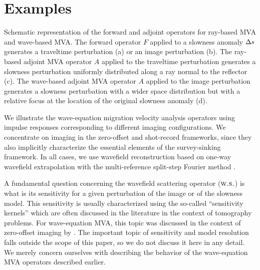 \section{Examples}

 {Schematic representation of the
forward and adjoint operators for ray-based MVA and wave-based
MVA. The forward operator $F$ applied to a slowness anomaly $\Delta s$
generates a traveltime perturbation (a) or an image perturbation
(b). The ray-based adjoint MVA operator $A$ applied to the traveltime
perturbation generates a slowness perturbation uniformly distributed
along a ray normal to the reflector (c). The wave-based adjoint MVA
operator $A$ applied to the image perturbation generates a slowness
perturbation with a wider space distribution but with a relative focus
at the location of the original slowness anomaly (d).}

We illustrate the wave-equation migration velocity analysis operators
using impulse responses corresponding to different imaging
configurations. We concentrate on imaging in the zero-offset and
shot-record frameworks, since they also implicitly characterize the
essential elements of the survey-sinking framework. In all cases, we
use wavefield reconstruction based on one-way wavefield extrapolation
with the multi-reference split-step Fourier method
\cite[]{GEO55-04-04100421,GEO61-05-14121416}.



A fundamental question concerning the wavefield scattering operator
(${\textbf{\sc w.s.}}$) is what is its sensitivity for a given perturbation of the
image or of the slowness model. This sensitivity is usually
characterized using the so-called ``sensitivity kernels'' which are
often discussed in the literature in the context of tomography
problems. For wave-equation MVA, this topic was discussed in the
context of zero-offset imaging by
\cite{SavaBiondi.gp.wemva1,SavaBiondi.gp.wemva2}.  The important topic
of sensitivity and model resolution falls outside the scope of this
paper, so we do not discuss it here in any detail. We merely concern
ourselves with describing the behavior of the wave-equation MVA
operators described earlier.

